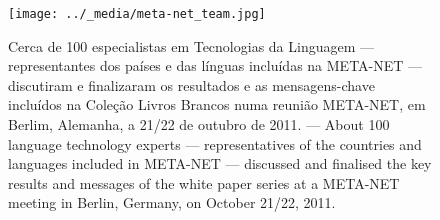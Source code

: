\renewcommand*{\figureformat}{}
\renewcommand*{\captionformat}{}

\begin{figure}[htbp]
  \center
  \texttt{[image: ../\_media/meta-net\_team.jpg]}
  \caption{Cerca de 100 especialistas em Tecnologias da Linguagem --- representantes dos países e das línguas incluídas na META-NET --- discutiram e finalizaram os resultados e as mensagens-chave incluídos na Coleção Livros Brancos numa reunião META-NET, em Berlim, Alemanha, a 21/22 de ou\-tu\-bro de 2011. --- \textcolor{grey1}{About 100 language technology experts --- representatives of the countries and languages included in META-NET --- discussed and finalised the key results and messages of the white paper  series at a META-NET meeting in Berlin, Germany, on October 21/22, 2011.}}
  \medskip
\end{figure}

\cleardoublepage

\label{whitepaperseries}

